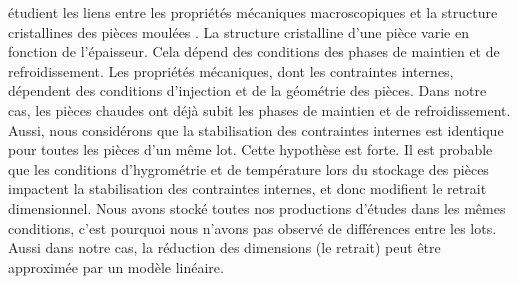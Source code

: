 \citeauthor{galeski_nano_2009} étudient les liens entre les propriétés mécaniques macroscopiques et la structure cristallines des pièces moulées \cite{galeski_nano_2009}.
La structure cristalline d'une pièce varie en fonction de l'épaisseur.
Cela dépend des conditions des phases de maintien et de refroidissement.
Les propriétés mécaniques, dont les contraintes internes, dépendent des conditions d'injection et de la géométrie des pièces.
Dans notre cas, les pièces chaudes ont déjà subit les phases de maintien et de refroidissement.
Aussi, nous considérons que la stabilisation des contraintes internes est identique pour toutes les pièces d'un même lot.
Cette hypothèse est forte.
Il est probable que les conditions d'hygrométrie et de température lors du stockage des pièces impactent la stabilisation des contraintes internes, et donc modifient le retrait dimensionnel.
Nous avons stocké toutes nos productions d'études dans les mêmes conditions, c'est pourquoi nous n'avons pas observé de différences entre les lots.
Aussi dans notre cas, la réduction des dimensions (le retrait) peut être approximée par un modèle linéaire.

